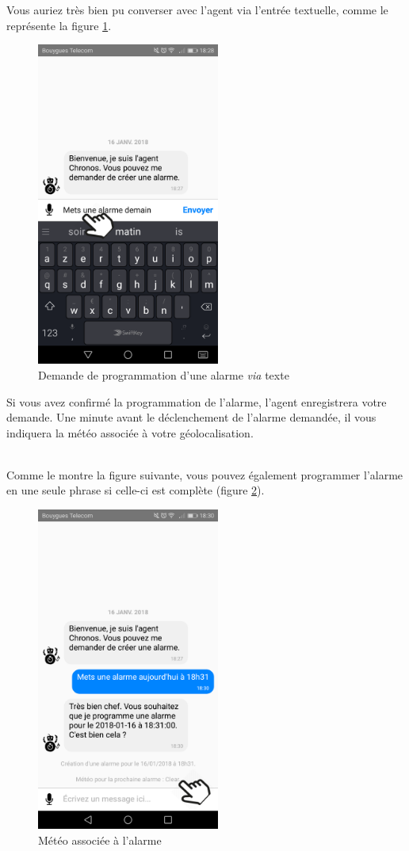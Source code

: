Vous auriez très bien pu converser avec l'agent via l'entrée textuelle, comme le représente la figure \ref{F}.

\begin{figure}[H]
  \centering
  \includegraphics[width=6cm]{images/F.png}
  \caption{Demande de programmation d'une alarme \emph{via} texte}
  \label{F}
\end{figure}

Si vous avez confirmé la programmation de l'alarme, l'agent enregistrera votre demande. Une minute avant le déclenchement de l'alarme demandée, il vous indiquera la météo associée à votre géolocalisation.

~\\\indent
Comme le montre la figure suivante, vous pouvez également programmer l'alarme en une seule phrase si celle-ci est complète (figure \ref{G}).

\begin{figure}[H]
  \centering
  \includegraphics[width=6cm]{images/G.png}
  \caption{Météo associée à l'alarme}
  \label{G}
\end{figure}

